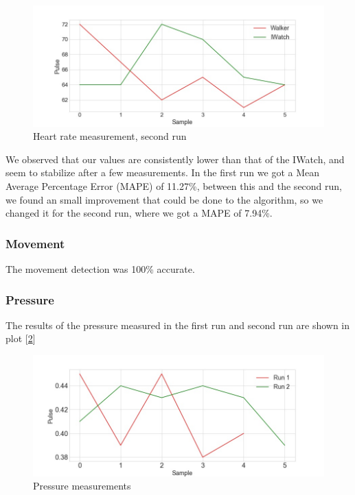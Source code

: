 			\begin{figure}[h!]
				\centering
				\includegraphics[width=1.1\linewidth]{gfx/pulse_run2_diff.jpg}
				\caption{Heart rate measurement, second run}
				\label{fig:HeartRateSecond}
			\end{figure}

			We observed that our values are consistently lower than that of the IWatch, and seem to stabilize after a few measurements. In the first run we got a Mean Average Percentage Error (MAPE) of 11.27\%, between this and the second run, we found an small improvement that could be done to the algorithm, so we changed it for the second run, where we got a MAPE of 7.94\%.

		\subsubsection{Movement}
			The movement detection was 100\% accurate.

		\subsubsection{Pressure}
			The results of the pressure measured in the first run and second run are shown in plot [\ref{fig:PressureDiff}]
			
			\begin{figure}[h!]
				\centering
				\includegraphics[width=1.1\linewidth]{gfx/pressure_diff.jpg}
				\caption{Pressure measurements}
				\label{fig:PressureDiff}
			\end{figure}


